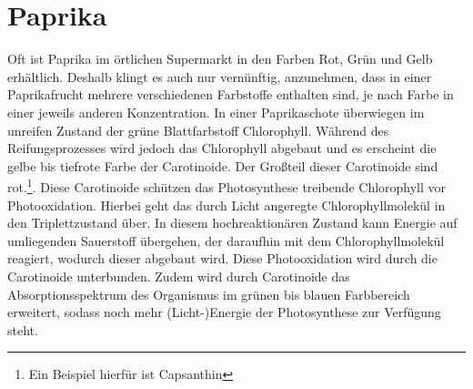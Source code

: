 \documentclass[11pt]{scrreprt}
\begin{document}
\section{Paprika}
Oft ist Paprika im örtlichen Supermarkt in den Farben Rot, Grün und Gelb erhältlich. Deshalb klingt es auch nur vernünftig, anzunehmen, dass in einer Paprikafrucht mehrere verschiedenen Farbstoffe enthalten sind, je nach Farbe in einer jeweils anderen Konzentration. In einer Paprikaschote überwiegen im unreifen Zustand der grüne Blattfarbstoff Chlorophyll. Während des Reifungsprozesses wird jedoch das Chlorophyll abgebaut und es erscheint die gelbe bis tiefrote Farbe der Carotinoide. Der Großteil dieser Carotinoide sind rot.\footnote{Ein Beispiel hierfür ist Capsanthin}.
Diese Carotinoide schützen das Photosynthese treibende Chlorophyll vor Photooxidation. Hierbei geht das durch Licht angeregte Chlorophyllmolekül in den Triplettzustand über. In diesem hochreaktionären Zustand kann Energie auf umliegenden Sauerstoff übergehen, der daraufhin mit dem Chlorophyllmolekül reagiert, wodurch dieser abgebaut wird.
Diese Photooxidation wird durch die Carotinoide unterbunden.
Zudem wird durch Carotinoide das Absorptionsspektrum des Organismus im grünen bis blauen Farbbereich erweitert, sodass noch mehr (Licht-)Energie der Photosynthese zur Verfügung steht.

\end{document}
